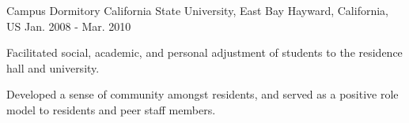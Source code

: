 


\begin{cventries}


\cventry
{Campus Dormitory}
{California State University, East Bay}
{Hayward, California, US}
{Jan. 2008 - Mar. 2010}
{
\begin{cvitems}
\item {Facilitated social, academic, and personal adjustment of students to the
    residence hall and university.}
\item {Developed a sense of community amongst residents, and served as a
    positive role model to residents and peer staff members.}
\end{cvitems}
}

\end{cventries}